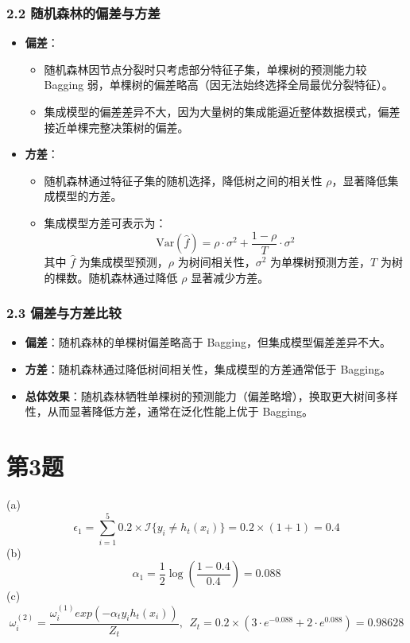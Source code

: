 \documentclass{article}
\begin{document}
\subsubsection*{2.2 随机森林的偏差与方差}
\begin{itemize}
    \item \textbf{偏差}：
    \begin{itemize}
        \item 随机森林因节点分裂时只考虑部分特征子集，单棵树的预测能力较 Bagging 弱，单棵树的偏差略高（因无法始终选择全局最优分裂特征）。
        \item 集成模型的偏差差异不大，因为大量树的集成能逼近整体数据模式，偏差接近单棵完整决策树的偏差。
    \end{itemize}
    \item \textbf{方差}：
    \begin{itemize}
        \item 随机森林通过特征子集的随机选择，降低树之间的相关性 $\rho$，显著降低集成模型的方差。
        \item 集成模型方差可表示为：
        \[
        \text{Var}(\hat{f}) = \rho \cdot \sigma^2 + \frac{1 - \rho}{T} \cdot \sigma^2
        \]
        其中 $\hat{f}$ 为集成模型预测，$\rho$ 为树间相关性，$\sigma^2$ 为单棵树预测方差，$T$ 为树的棵数。随机森林通过降低 $\rho$ 显著减少方差。
    \end{itemize}
\end{itemize}

\subsubsection*{2.3 偏差与方差比较}
\begin{itemize}
    \item \textbf{偏差}：随机森林的单棵树偏差略高于 Bagging，但集成模型偏差差异不大。
    \item \textbf{方差}：随机森林通过降低树间相关性，集成模型的方差通常低于 Bagging。
    \item \textbf{总体效果}：随机森林牺牲单棵树的预测能力（偏差略增），换取更大树间多样性，从而显著降低方差，通常在泛化性能上优于 Bagging。
\end{itemize}

\section*{第3题}
(a)
\[\epsilon_1=\sum_{i=1}^{5}0.2\times\mathcal{I}\{y_i\neq h_t(x_i)\}=0.2\times (1+1)=0.4\]
(b)
\[\alpha_1=\frac{1}{2}\log(\frac{1-0.4}{0.4})=0.088\]
(c)
\[\omega_{i}^{(2)}=\frac{\omega_i^{(1)}exp(-\alpha_ty_ih_t(x_i))}{Z_t},~~Z_t=0.2\times(3\cdot e^{-0.088}+2\cdot e^{0.088})=0.98628\]
\end{document}
